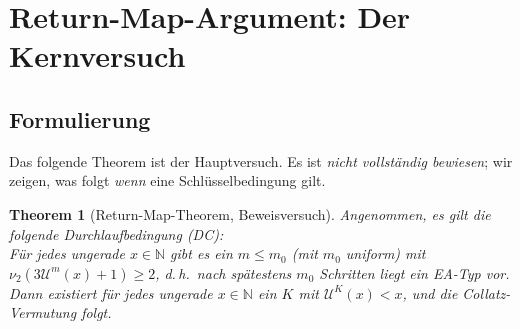 \documentclass[12pt,a4paper]{article}
\newtheorem{theorem}[definition]{Theorem}
\newcommand{\vii}{\nu_2}           %
\newcommand{\U}{\mathcal{U}}       %
\newcommand{\N}{\mathbb{N}}
\begin{document}
\section{Return-Map-Argument: Der Kernversuch}

\subsection{Formulierung}

Das folgende Theorem ist der Hauptversuch. Es ist \emph{nicht vollständig bewiesen};
wir zeigen, was folgt \emph{wenn} eine Schlüsselbedingung gilt.

\begin{theorem}[Return-Map-Theorem, Beweisversuch]\label{thm:return-map}
Angenommen, es gilt die folgende \emph{Durchlaufbedingung} \textup{(DC)}: \\[0.3em]
\emph{Für jedes ungerade $x \in \N$ gibt es ein $m \leq m_0$ (mit $m_0$ uniform)
mit $\vii(3\U^m(x)+1) \geq 2$, d.\,h.\ nach spätestens $m_0$ Schritten
liegt ein EA-Typ vor.}\\[0.3em]
Dann existiert für jedes ungerade $x \in \N$ ein $K$ mit
$\U^K(x) < x$, und die Collatz-Vermutung folgt.
\end{theorem}
\end{document}
